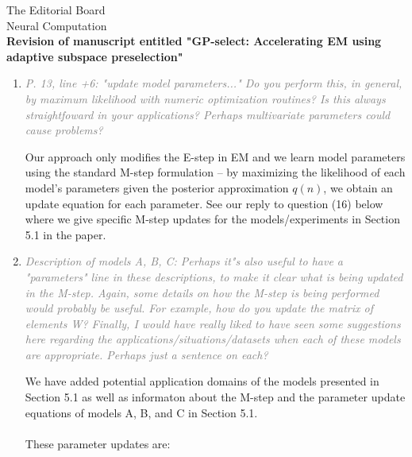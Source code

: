 \documentclass[10pt]{letter}
\newcommand{\rvr}[1]{\textcolor{gray}{#1}}
\begin{document}
\begin{letter}{
The Editorial Board\\
Neural Computation\\
\vspace{10mm}
\textbf{Revision of manuscript entitled "GP-select: Accelerating EM using adaptive
subspace preselection"}
}
\begin{enumerate}[topsep=3pt,itemsep=2ex,partopsep=1ex,parsep=1ex]
    
    Indeed, this is a subtle point, and one we should have been clearer about: we do not use a sigmoid link, but merely do a GP regression of the expected indicator of $s$. This is, of course, not a good estimate of a probability (it can be negative, or greater than one), and we will emphasize this. From the selection perspective, however, it's not really necessary to avoid these pathologies, and to use a sigmoid squashing function, as we only want an ordering of the variables. As you point out, GP classification with a properly defined likelihood will no longer have a marginal Gaussian distribution, and we would no longer be able to trivially express the posterior means of different functions with the same inputs, without considerable extra computation.

See our reply to Reviewer 2, in point (1), who also had questions about this topic.

    \item \rvr{\emph{P. 13, line +6: "update model parameters..."  Do you perform this, in general, by maximum likelihood with numeric optimization routines? Is this always straightfoward in your applications? Perhaps multivariate parameters could cause problems?}}

Our approach only modifies the E-step in EM and we learn model parameters using the standard M-step formulation -- by maximizing the likelihood of each model's parameters given the posterior approximation $q(n)$, we obtain an update equation for each parameter. See our reply to question (16) below where we give specific M-step updates for the models/experiments in Section 5.1 in the paper.

    \item \rvr{\emph{Description of models A, B, C: Perhaps it"s also useful to have a "parameters"  line in these descriptions, to make it clear what is being updated in the M-step. Again, some details on how the M-step is being performed would probably be useful. For example, how do you update the matrix of elements W? Finally, I would have really liked to have seen some suggestions here regarding the applications/situations/datasets when each of these models are appropriate. Perhaps just a sentence on each?}}

    We have added potential application domains of the models presented in Section 5.1 as well as
    informaton about the M-step and the parameter update equations of models A, B, and C in Section 5.1.\\
    \\
    These parameter updates are:\\
 

\end{enumerate}
\end{letter}
\end{document}
